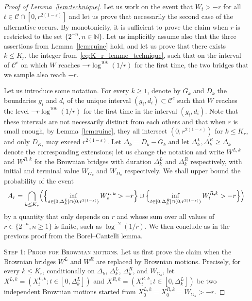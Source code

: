 \documentclass[10pt,a4paper]{amsart}
\newcommand{\N}{\mathbb{N}}
\begin{document}
\begin{proof}[Proof of Lemma~\ref{lem:technique}]
Let us work on the event that $W_t > -r$ for all $t \in \mathcal{C} \cap [0, r^{2(1-\varepsilon)}]$ and let us prove that necessarily the second case of the alternative occurs.
By monotonicity, it is sufficient to prove the claim when $r$ is restricted to the set $\{2^{-n}, n \in \N\}$. 
Let us implicitly assume also that the three assertions from Lemma~\ref{lem:ruine} hold, and let us prove that there exists $k \leq K_r$, the integer from~\eqref{eq:K_r_lemme_technique}, such that on the interval of $\mathcal{C}^c$ on which $W$ reaches $-r \log^{10k}(1/r)$ for the first time, the two bridges that we sample also reach $-r$.

 
Let us introduce some notation. For every $k \geq 1$, denote by $G_k$ and $D_k$ the boundaries $g_i$ and $d_i$ of the unique interval $(g_i, d_i) \subset \mathcal{C}^c$ such that 
$W$ reaches the level $-r \log^{10 k}(1/r)$ for the first time in the interval $(g_i, d_i)$. 
Note that these intervals are not necessarily distinct from each others and that when $r$ is small enough, by Lemma~\ref{lem:ruine}, they all intersect $(0, r^{2(1-\varepsilon)})$ for $k \leq K_{r}$, and only $D_{K_r}$ may exceed $r^{2(1-\varepsilon)}$. 
Let $\Delta_k = D_k-G_k$ and let $\Delta^L_k, \Delta^R_k \geq \Delta_k$ denote the corresponding extensions; let us change the notation and write $W^{L,k}$ and $W^{R,k}$ for the Brownian bridges with duration $\Delta^L_k$ and $\Delta^R_k$ respectively, with initial and terminal value $W_{G_k}$ and $W_{D_k}$ respectively.
We shall upper bound the probability of the event
\[A_r = \bigcap_{k \leq K_r} \Bigl(\Bigl\{\inf_{s \in [0,\Delta^L_k] \cap (0, r^{2(1-\varepsilon)})} W^{L,k}_s > -r\Bigr\} \cup \Bigl\{\inf_{t \in [0,\Delta^R_k] \cap (0, r^{2(1-\varepsilon)})} W^{R,k}_t > -r\Bigr\}\Bigr)\]
by a quantity that only depends on $r$ and whose sum over all values of $r \in \{2^{-n}, n \geq 1\}$ is finite, such as $\log^{-2}(1/r)$. 
We then conclude as in the previous proof from the Borel--Cantelli lemma. 
\medskip

\textsc{Step 1: Proof for Brownian motions.}
Let us first prove the claim when the Brownian bridges $W^L$ and $W^R$ are replaced by Brownian motions. Precisely, for every $k \leq K_r$, conditionally on $\Delta_k$, $\Delta_k^L$, $\Delta_k^R$, and $W_{G_k}$, let $X^{L,k} = (X^{L,k}_t ; t \in [0, \Delta_k^L])$ and $X^{R,k} = (X^{R,k}_t ; t \in [0, \Delta_k^L])$ be two independent Brownian motions started from $X^{L,k}_0=X^{R,k}_0=W_{G_k} > -r$.


\end{proof}
\end{document}
